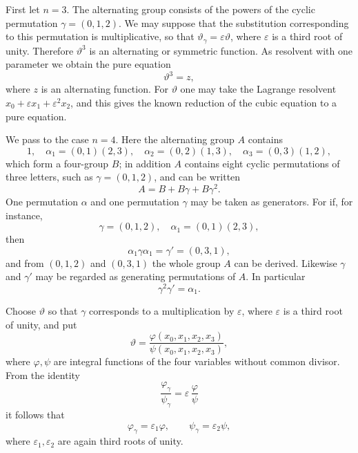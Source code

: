\documentclass[11pt]{article}
\begin{document}
First let \(n=3\). The alternating group consists of the powers of the cyclic permutation \(\gamma=(0,1,2)\). We may suppose that the substitution corresponding to this permutation is multiplicative, so that \(\vartheta_\gamma=\varepsilon\vartheta\), where \(\varepsilon\) is a third root of unity. Therefore \(\vartheta^3\) is an alternating or symmetric function. As resolvent with one parameter we obtain the pure equation
\[
\vartheta^3=z,
\]
where \(z\) is an alternating function. For \(\vartheta\) one may take the Lagrange resolvent \(x_0+\varepsilon x_1+\varepsilon^2x_2\), and this gives the known reduction of the cubic equation to a pure equation.

We pass to the case \(n=4\). Here the alternating group \(A\) contains
\[
1,\quad
\alpha_1=(0,1)(2,3),\quad
\alpha_2=(0,2)(1,3),\quad
\alpha_3=(0,3)(1,2),
\]
which form a four-group \(B\); in addition \(A\) contains eight cyclic permutations of three letters, such as \(\gamma=(0,1,2)\), and can be written
\[
A=B+B\gamma+B\gamma^2.
\]
One permutation \(\alpha\) and one permutation \(\gamma\) may be taken as generators. For if, for instance,
\[
\gamma=(0,1,2),\quad \alpha_1=(0,1)(2,3),
\]
then
\begin{equation}
\alpha_1\gamma\alpha_1=\gamma'=(0,3,1),
\tag{1}
\end{equation}
and from \((0,1,2)\) and \((0,3,1)\) the whole group \(A\) can be derived. Likewise \(\gamma\) and \(\gamma'\) may be regarded as generating permutations of \(A\). In particular
\begin{equation}
\gamma^2\gamma'=\alpha_1.
\tag{2}
\end{equation}

Choose \(\vartheta\) so that \(\gamma\) corresponds to a multiplication by \(\varepsilon\), where \(\varepsilon\) is a third root of unity, and put
\begin{equation}
\vartheta=
\frac{\varphi(x_0,x_1,x_2,x_3)}
{\psi(x_0,x_1,x_2,x_3)},
\tag{3}
\end{equation}
where \(\varphi,\psi\) are integral functions of the four variables without common divisor. From the identity
\[
\frac{\varphi_\gamma}{\psi_\gamma}
=\varepsilon\,\frac{\varphi}{\psi}
\]
it follows that
\begin{equation}
\varphi_\gamma=\varepsilon_1\varphi,\qquad
\psi_\gamma=\varepsilon_2\psi,
\tag{4}
\end{equation}
where \(\varepsilon_1,\varepsilon_2\) are again third roots of unity.
\end{document}
